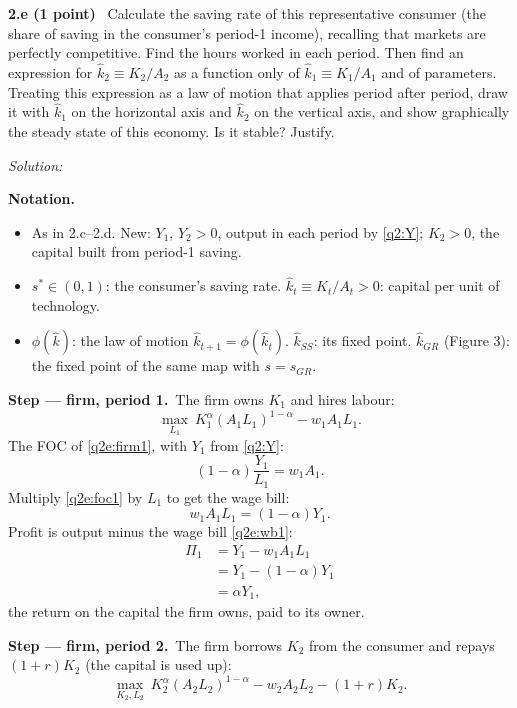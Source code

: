 \documentclass[11pt,a4paper]{article}
\newif\ifsolucoes
\newcommand{\sub}[2]{\Needspace{8\baselineskip}\par\medskip\noindent\textbf{#1 (#2)}~}
\newcommand{\resolespaco}[1][6cm]{\ifsolucoes\else\par\textit{Solution:}\vspace{#1}\par\fi}
\newcommand{\passo}[2]{\par\smallskip\noindent\textbf{Step --- #1.}~#2}
\newenvironment{notacao}{\par\smallskip\noindent\textbf{Notation.}\begin{itemize}[leftmargin=1.4em,topsep=1pt,itemsep=0pt]\small}{\end{itemize}}
\begin{document}
\sub{2.e}{1 point} Calculate the saving rate of this representative consumer (the share of saving
in the consumer's period-1 income), recalling that markets are perfectly competitive. Find the hours
worked in each period. Then find an expression for $\hat k_2\equiv K_2/A_2$ as a function only of
$\hat k_1\equiv K_1/A_1$ and of parameters. Treating this expression as a law of motion that applies
period after period, draw it with $\hat k_1$ on the horizontal axis and $\hat k_2$ on the vertical
axis, and show graphically the steady state of this economy. Is it stable? Justify.
\resolespaco[8cm]
\begin{sol}
\begin{notacao}
\item As in 2.c--2.d. New: $Y_1$, $Y_2>0$, output in each period by \eqref{q2:Y}; $K_2>0$, the
capital built from period-1 saving.
\item $s^\ast\in(0,1)$: the consumer's saving rate. $\hat k_t\equiv K_t/A_t>0$: capital per unit of
technology.
\item $\phi(\hat k)$: the law of motion $\hat k_{t+1}=\phi(\hat k_t)$. $\hat k_{SS}$: its fixed point.
$\hat k_{GR}$ (Figure 3): the fixed point of the same map with $s=s_{GR}$.
\end{notacao}
\passo{firm, period 1}{The firm owns $K_1$ and hires labour:}
\begin{equation}
\max_{L_1}\ K_1^{\alpha}(A_1L_1)^{1-\alpha}-w_1A_1L_1. \label{q2e:firm1}
\end{equation}
The FOC of \eqref{q2e:firm1}, with $Y_1$ from \eqref{q2:Y}:
\begin{equation}
(1-\alpha)\frac{Y_1}{L_1}=w_1A_1. \label{q2e:foc1}
\end{equation}
Multiply \eqref{q2e:foc1} by $L_1$ to get the wage bill:
\begin{equation}
w_1A_1L_1=(1-\alpha)Y_1. \label{q2e:wb1}
\end{equation}
Profit is output minus the wage bill \eqref{q2e:wb1}:
\begin{align}
\Pi_1 &= Y_1-w_1A_1L_1\nonumber\\
&= Y_1-(1-\alpha)Y_1\nonumber\\
&= \boxed{\alpha Y_1}, \label{q2e:pi1}
\end{align}
the return on the capital the firm owns, paid to its owner.
\passo{firm, period 2}{The firm borrows $K_2$ from the consumer and repays $(1+r)K_2$ (the capital
is used up):}
\begin{equation}
\max_{K_2,L_2}\ K_2^{\alpha}(A_2L_2)^{1-\alpha}-w_2A_2L_2-(1+r)K_2. \label{q2e:firm2}

\end{equation}
\end{sol}
\end{document}
